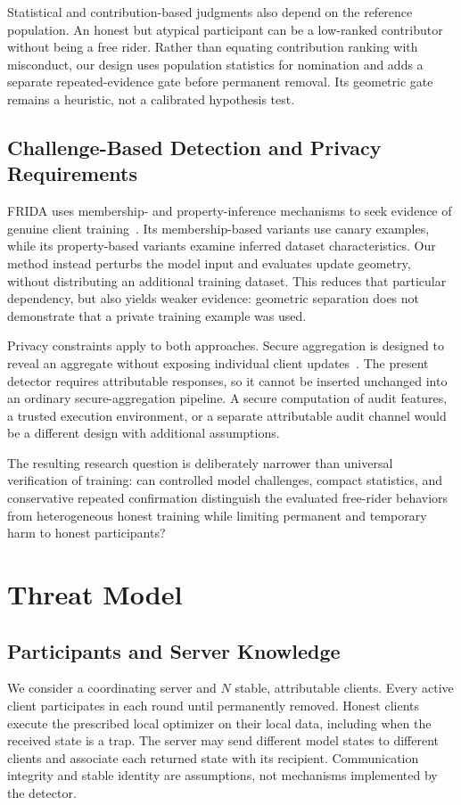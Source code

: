 \documentclass[conference]{IEEEtran}
\begin{document}
Statistical and contribution-based judgments also depend on the reference
population. An honest but atypical participant can be a low-ranked contributor
without being a free rider. Rather than equating contribution ranking with
misconduct, our design uses population statistics for nomination and adds a
separate repeated-evidence gate before permanent removal. Its geometric gate
remains a heuristic, not a calibrated hypothesis test.

\subsection{Challenge-Based Detection and Privacy Requirements}
FRIDA uses membership- and property-inference mechanisms to seek evidence of
genuine client training~\cite{recasens2026frida}. Its membership-based variants
use canary examples, while its property-based variants examine inferred dataset
characteristics. Our method instead perturbs the model input and evaluates
update geometry, without distributing an additional training dataset. This
reduces that particular dependency, but also yields weaker evidence: geometric
separation does not demonstrate that a private training example was used.

Privacy constraints apply to both approaches. Secure aggregation is designed to
reveal an aggregate without exposing individual client updates~\cite{bonawitz2017practical}.
The present detector requires attributable responses, so it cannot be inserted
unchanged into an ordinary secure-aggregation pipeline. A secure computation
of audit features, a trusted execution environment, or a separate attributable
audit channel would be a different design with additional assumptions.

The resulting research question is deliberately narrower than universal
verification of training: can controlled model challenges, compact statistics,
and conservative repeated confirmation distinguish the evaluated free-rider
behaviors from heterogeneous honest training while limiting permanent and
temporary harm to honest participants?

\section{Threat Model}
\subsection{Participants and Server Knowledge}
We consider a coordinating server and $N$ stable, attributable clients. Every
active client participates in each round until permanently removed. Honest
clients execute the prescribed local optimizer on their local data, including
when the received state is a trap. The server may send different model states
to different clients and associate each returned state with its recipient.
Communication integrity and stable identity are assumptions, not mechanisms
implemented by the detector.
\end{document}
